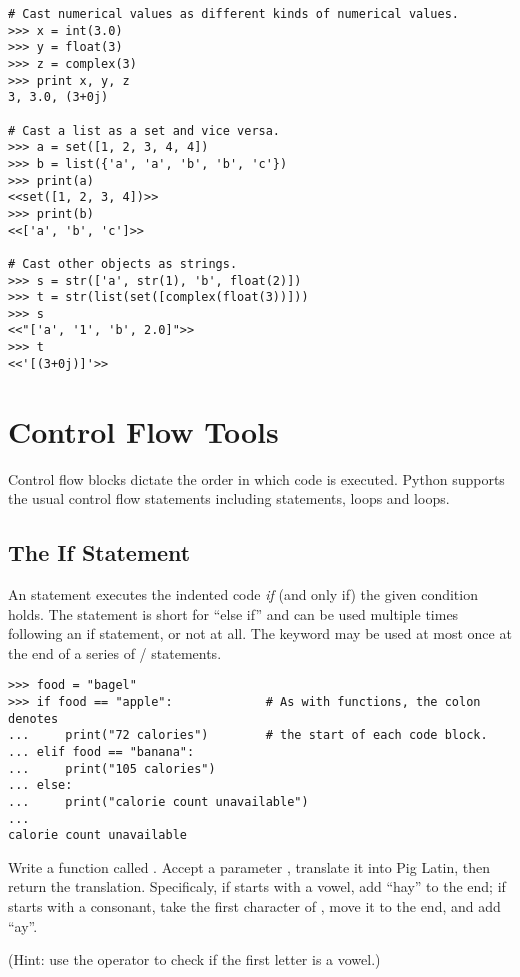 \begin{lstlisting}
# Cast numerical values as different kinds of numerical values.
>>> x = int(3.0)
>>> y = float(3)
>>> z = complex(3)
>>> print x, y, z
3, 3.0, (3+0j)

# Cast a list as a set and vice versa.
>>> a = set([1, 2, 3, 4, 4])
>>> b = list({'a', 'a', 'b', 'b', 'c'})
>>> print(a)
<<set([1, 2, 3, 4])>>
>>> print(b)
<<['a', 'b', 'c']>>

# Cast other objects as strings.
>>> s = str(['a', str(1), 'b', float(2)])
>>> t = str(list(set([complex(float(3))]))
>>> s
<<"['a', '1', 'b', 2.0]">>
>>> t
<<'[(3+0j)]'>>

\end{lstlisting}

\section*{Control Flow Tools} %
Control flow blocks dictate the order in which code is executed.
Python supports the usual control flow statements including  statements,  loops and  loops.

\subsection*{The If Statement} %

An  statement executes the indented code \emph{if} (and only if) the given condition holds.
The  statement is short for ``else if'' and can be used multiple times following an if statement, or not at all. 
The  keyword may be used at most once at the end of a series of / statements.
\begin{lstlisting}
>>> food = "bagel"         
>>> if food == "apple":             # As with functions, the colon denotes
...     print("72 calories")        # the start of each code block.
... elif food == "banana":
...     print("105 calories")
... else: 
...     print("calorie count unavailable")
...     
calorie count unavailable
\end{lstlisting}

\begin{problem} %
Write a function called .
Accept a parameter , translate it into Pig Latin, then return the translation.
Specificaly, if  starts with a vowel, add ``hay'' to the end; if  starts with a consonant, take the first character of , move it to the end, and add ``ay''.

(Hint: use the  operator to check if the first letter is a vowel.)
\end{problem}

